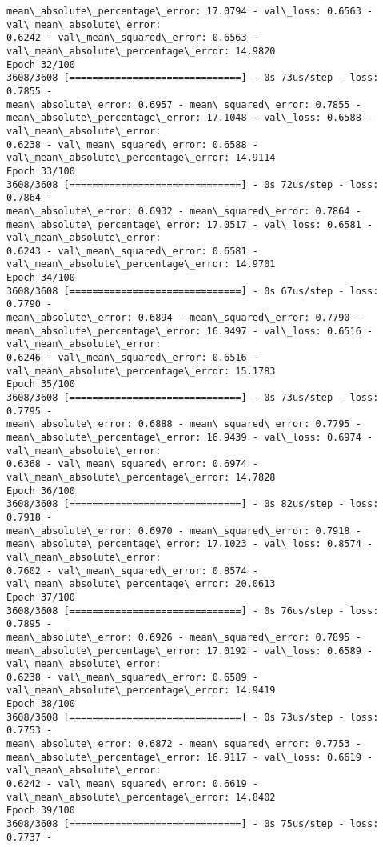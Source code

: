 \documentclass[11pt]{article}
\begin{document}
\begin{Verbatim}[commandchars=\\\{\},fontsize=\footnotesize]
mean\_absolute\_percentage\_error: 17.0794 - val\_loss: 0.6563 - val\_mean\_absolute\_error:
0.6242 - val\_mean\_squared\_error: 0.6563 - val\_mean\_absolute\_percentage\_error: 14.9820
Epoch 32/100
3608/3608 [==============================] - 0s 73us/step - loss: 0.7855 -
mean\_absolute\_error: 0.6957 - mean\_squared\_error: 0.7855 -
mean\_absolute\_percentage\_error: 17.1048 - val\_loss: 0.6588 - val\_mean\_absolute\_error:
0.6238 - val\_mean\_squared\_error: 0.6588 - val\_mean\_absolute\_percentage\_error: 14.9114
Epoch 33/100
3608/3608 [==============================] - 0s 72us/step - loss: 0.7864 -
mean\_absolute\_error: 0.6932 - mean\_squared\_error: 0.7864 -
mean\_absolute\_percentage\_error: 17.0517 - val\_loss: 0.6581 - val\_mean\_absolute\_error:
0.6243 - val\_mean\_squared\_error: 0.6581 - val\_mean\_absolute\_percentage\_error: 14.9701
Epoch 34/100
3608/3608 [==============================] - 0s 67us/step - loss: 0.7790 -
mean\_absolute\_error: 0.6894 - mean\_squared\_error: 0.7790 -
mean\_absolute\_percentage\_error: 16.9497 - val\_loss: 0.6516 - val\_mean\_absolute\_error:
0.6246 - val\_mean\_squared\_error: 0.6516 - val\_mean\_absolute\_percentage\_error: 15.1783
Epoch 35/100
3608/3608 [==============================] - 0s 73us/step - loss: 0.7795 -
mean\_absolute\_error: 0.6888 - mean\_squared\_error: 0.7795 -
mean\_absolute\_percentage\_error: 16.9439 - val\_loss: 0.6974 - val\_mean\_absolute\_error:
0.6368 - val\_mean\_squared\_error: 0.6974 - val\_mean\_absolute\_percentage\_error: 14.7828
Epoch 36/100
3608/3608 [==============================] - 0s 82us/step - loss: 0.7918 -
mean\_absolute\_error: 0.6970 - mean\_squared\_error: 0.7918 -
mean\_absolute\_percentage\_error: 17.1023 - val\_loss: 0.8574 - val\_mean\_absolute\_error:
0.7602 - val\_mean\_squared\_error: 0.8574 - val\_mean\_absolute\_percentage\_error: 20.0613
Epoch 37/100
3608/3608 [==============================] - 0s 76us/step - loss: 0.7895 -
mean\_absolute\_error: 0.6926 - mean\_squared\_error: 0.7895 -
mean\_absolute\_percentage\_error: 17.0192 - val\_loss: 0.6589 - val\_mean\_absolute\_error:
0.6238 - val\_mean\_squared\_error: 0.6589 - val\_mean\_absolute\_percentage\_error: 14.9419
Epoch 38/100
3608/3608 [==============================] - 0s 73us/step - loss: 0.7753 -
mean\_absolute\_error: 0.6872 - mean\_squared\_error: 0.7753 -
mean\_absolute\_percentage\_error: 16.9117 - val\_loss: 0.6619 - val\_mean\_absolute\_error:
0.6242 - val\_mean\_squared\_error: 0.6619 - val\_mean\_absolute\_percentage\_error: 14.8402
Epoch 39/100
3608/3608 [==============================] - 0s 75us/step - loss: 0.7737 -

\end{Verbatim}
\end{document}
